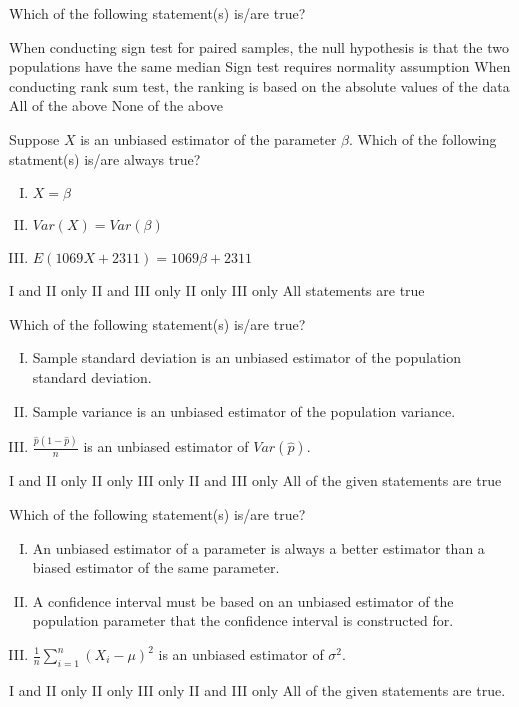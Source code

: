 \documentclass[letterpaper,10pt,addpoints]{exam}
\begin{document}
\begin{questions}
\question Which of the following statement(s) is/are true?
\begin{choices}
  \choice When conducting sign test for paired samples, the null hypothesis is that the two populations have the same median
  \choice Sign test requires normality assumption
  \choice When conducting rank sum test, the ranking is based on the absolute values of the data
  \choice All of the above
  \correctchoice None of the above
\end{choices}

\question Suppose $X$ is an unbiased estimator of the parameter $\beta$. Which of the following statment(s) is/are always true?
\begin{enumerate}[I.]
  \item $X = \beta$
  \item $Var(X) = Var(\beta)$
  \item $E(1069X+2311) = 1069\beta+2311$
\end{enumerate}
\begin{choices}
  \choice I and II only
  \choice II and III only
  \choice II only
  \correctchoice III only
  \choice All statements are true
  \end{choices}


\question Which of the following statement(s) is/are true?
\begin{enumerate}[I.]
  \item Sample standard deviation is an unbiased estimator of the population standard deviation.
  \item Sample variance is an unbiased estimator of the population variance.
  \item $\frac{\hat{p}(1-\hat{p})}{n}$ is an unbiased estimator of $Var(\hat{p})$.
\end{enumerate}
\begin{choices}
  \choice I and II only
  \correctchoice II only
  \choice III only
  \choice II and III only
  \choice All of the given statements are true
  \end{choices}

\question Which of the following statement(s) is/are true?
\begin{enumerate}[I.]
  \item An unbiased estimator of a parameter is always a better estimator than a biased estimator of the same parameter.
  \item A confidence interval must be based on an unbiased estimator of the population parameter that the confidence interval is constructed for.
  \item $\frac{1}{n}\sum_{i=1}^n(X_i - \mu)^2$ is an unbiased estimator of $\sigma^2$.
\end{enumerate}
\begin{choices}
  \choice I and II only
  \choice II only
  \correctchoice III only
  \choice II and III only
  \choice All of the given statements are true.
  \end{choices}


\end{questions}
\end{document}

